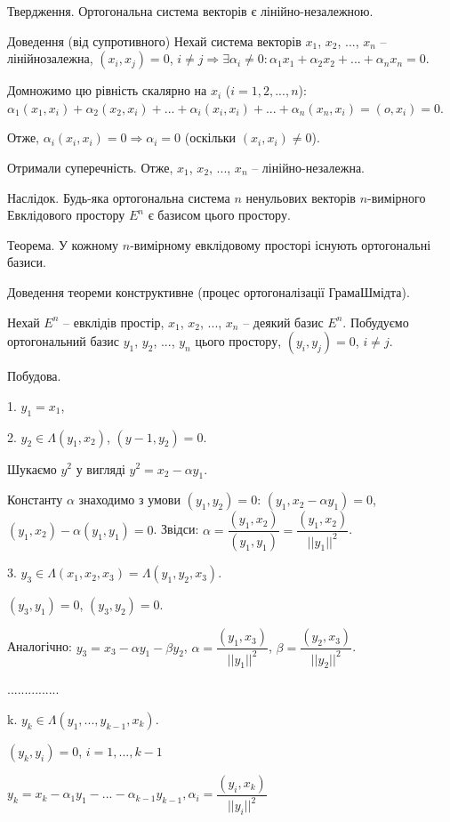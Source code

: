 Твердження. Ортогональна система векторів є лінійно-незалежною.

Доведення (від супротивного) Нехай система векторів $x_1$, $x_2$, ..., $x_n$ -- лінійнозалежна,
$(x_i, x_j) = 0$, $i \neq j \Rightarrow \exists \alpha_i \neq 0: \alpha_1 x_1 + \alpha_2 x_2 + ... + \alpha_n x_n = 0$.

Домножимо цю рівність скалярно на $x_i$ ($i = 1, 2, ..., n$):
$\alpha_1(x_1,x_i) + \alpha_2(x_2,x_i) + ... + \alpha_i(x_i,x_i) + ... + \alpha_n(x_n,x_i) = (o, x_i) = 0$.

Отже, $\alpha_i(x_i,x_i) = 0 \Rightarrow \alpha_i = 0$ (оскільки $(x_i,x_i) \neq 0$).

Отримали суперечність. Отже, $x_1$, $x_2$, ..., $x_n$ -- лінійно-незалежна.

Наслідок. Будь-яка ортогональна система $n$ ненульових векторів $n$-вимірного
Евклідового простору $E^n$ є базисом цього простору.

Теорема. У кожному $n$-вимірному евклідовому просторі існують
ортогональні базиси.

Доведення теореми конструктивне (процес ортогоналізації ГрамаШмідта).

Нехай $E^n$ -- евклідів простір, $x_1$, $x_2$, ..., $x_n$ -- деякий базис $E^n$. Побудуємо
ортогональний базис $y_1$, $y_2$, ..., $y_n$ цього простору, $(y_i, y_j) = 0$, $i \neq j$.

Побудова.

1. $y_1 = x_1$,

2. $y_2 \in \Lambda(y_1, x_2)$, $(y-1, y_2) = 0$.

Шукаємо $y^2$ у вигляді $y^2 = x_2 - \alpha y_1$.

Константу $\alpha$ знаходимо з умови $(y_1, y_2) = 0$: $(y_1, x_2 - \alpha y_1) = 0$,
$(y_1, x_2) - \alpha(y_1, y_1) = 0$. Звідси: $\alpha = \dfrac{(y_1,x_2)}{(y_1,y_1)} = \dfrac{(y_1,x_2)}{||y_1||^2}$.


3. $y_3 \in \Lambda(x_1, x_2, x_3) = \Lambda(y_1, y_2, x_3)$.

$(y_3, y_1) = 0$, $(y_3, y_2) = 0$.

Аналогічно: $y_3 = x_3 - \alpha y_1 - \beta y_2$, $\alpha = \dfrac{(y_1, x_3)}{||y_1||^2}$,
$\beta = \dfrac{(y_2, x_3)}{||y_2||^2}$.

...............

k. $y_k \in \Lambda(y_1, ..., y_{k-1}, x_k)$.

$(y_k, y_i) = 0$, $i = 1, ..., k-1$

$y_k = x_k - \alpha_1 y_1 - ... - \alpha_{k-1} y_{k-1}, \alpha_i = \dfrac{(y_i, x_k)}{||y_i||^2}$

